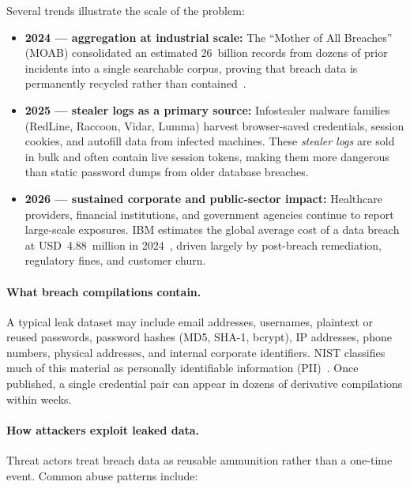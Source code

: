 Several trends illustrate the scale of the problem:

\begin{itemize}[nosep]
  \item \textbf{2024 --- aggregation at industrial scale:} The ``Mother of All
        Breaches'' (MOAB) consolidated an estimated 26~billion records from
        dozens of prior incidents into a single searchable corpus, proving
        that breach data is permanently recycled rather than
        contained~\cite{moab}.
  \item \textbf{2025 --- stealer logs as a primary source:} Infostealer
        malware families (RedLine, Raccoon, Vidar, Lumma) harvest
        browser-saved credentials, session cookies, and autofill data from
        infected machines. These \emph{stealer logs} are sold in bulk and
        often contain live session tokens, making them more dangerous than
        static password dumps from older database breaches.
  \item \textbf{2026 --- sustained corporate and public-sector impact:}
        Healthcare providers, financial institutions, and government agencies
        continue to report large-scale exposures. IBM estimates the global
        average cost of a data breach at USD~4.88~million in
        2024~\cite{ibm-breach-report}, driven largely by post-breach
        remediation, regulatory fines, and customer churn.
\end{itemize}

\paragraph{What breach compilations contain.}
A typical leak dataset may include email addresses, usernames, plaintext or
reused passwords, password hashes (MD5, SHA-1, bcrypt), IP addresses, phone
numbers, physical addresses, and internal corporate identifiers. NIST
classifies much of this material as personally identifiable information
(PII)~\cite{nist-breach}. Once published, a single credential pair can appear
in dozens of derivative compilations within weeks.

\paragraph{How attackers exploit leaked data.}
Threat actors treat breach data as reusable ammunition rather than a one-time
event. Common abuse patterns include:

